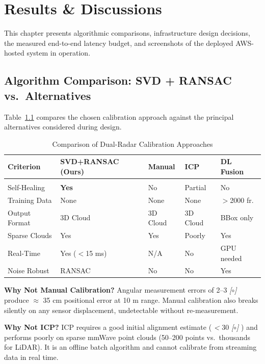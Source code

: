 \chapter{Results \& Discussions}



This chapter presents algorithmic comparisons, infrastructure design decisions, the measured end-to-end latency budget, and screenshots of the deployed AWS-hosted system in operation.

\section{Algorithm Comparison: SVD + RANSAC vs.\ Alternatives}

Table~\ref{tab:summary_7} compares the chosen calibration approach against the principal alternatives considered during design.

\begin{table}[H]
\caption{Comparison of Dual-Radar Calibration Approaches}
\label{tab:summary_7}
\centering
\begin{tabularx}{\textwidth}{@{} l X X X X @{}}
\toprule
\textbf{Criterion} & \textbf{SVD+RANSAC (Ours)} & \textbf{Manual} & \textbf{ICP} & \textbf{DL Fusion} \\ \midrule
& & & & \\
Self-Healing & \textbf{Yes} & No & Partial & No \\
Training Data & None & None & None & $>$2000 fr. \\
Output Format & 3D Cloud & 3D Cloud & 3D Cloud & BBox only \\
Sparse Clouds & Yes & Yes & Poorly & Yes \\
Real-Time & Yes ($<$15 ms) & N/A & No & GPU needed \\
Noise Robust & RANSAC & No & No & Yes \\ \bottomrule
\end{tabularx}
\end{table}



\textbf{Why Not Manual Calibration?} Angular measurement errors of 2--3 \textit{[$\circ$]} produce \textit{$\approx$} 35 cm positional error at 10 m range. Manual calibration also breaks silently on any sensor displacement, undetectable without re-measurement.

\textbf{Why Not ICP?} ICP requires a good initial alignment estimate ( \textit{<} 30 \textit{[$\circ$]} ) and performs poorly on sparse mmWave point clouds (50--200 points vs.\ thousands for LiDAR). It is an offline batch algorithm and cannot calibrate from streaming data in real time.

